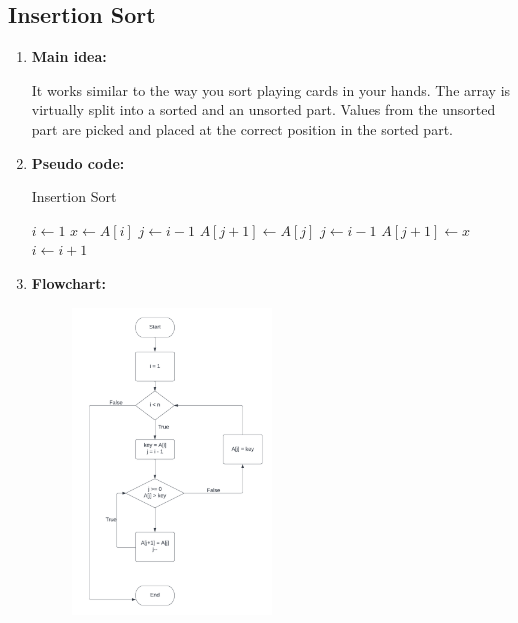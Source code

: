 \documentclass[11pt,a4paper]{article}
\begin{document}
{\begin{enumerate}
				
			\end{enumerate}
		
		\subsection{Insertion Sort}
			\begin{enumerate}[label=\textbf{\arabic*})]
				\item \textbf{Main idea:}
			
				It works similar to the way you sort playing cards in your hands. The array is virtually split into a sorted and an unsorted part. Values from the unsorted part are picked and placed at the correct position in the sorted part.
				\\[12pt]
				\item \textbf{Pseudo code:}
				
				\begin{algorithm}
					\caption{Insertion Sort}
					\begin{algorithmic} 
						\STATE $i \leftarrow 1$
						\STATE $x \leftarrow A[i]$
						\STATE $j \leftarrow i - 1$ 
						\STATE $A[j+1] \leftarrow A[j]$
						\STATE $j \leftarrow i - 1$ 
						\ENDWHILE
						\STATE $A[j+1] \leftarrow x$ 
						\STATE $i \leftarrow i + 1$ 
						\ENDWHILE
					\end{algorithmic}
				\end{algorithm}
				
				\item \textbf{Flowchart:}
					\begin{figure}[h!]
						\centering
						\includegraphics[width=0.5\textwidth]{Insertion Sort}
					\end{figure}
					

\end{enumerate}}
\end{document}
